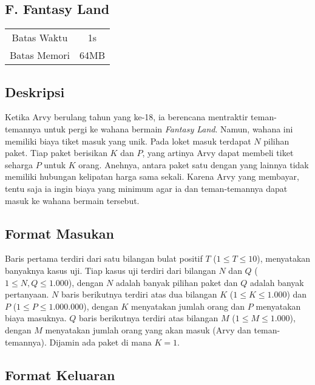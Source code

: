 \documentclass{article}
\begin{document}
\begin{center}
    \section*{F. Fantasy Land} %

    \begin{tabular}{ | c c | }
        \hline
        Batas Waktu  & 1s \\    %
        Batas Memori & 64MB \\  %
        \hline
    \end{tabular}
\end{center}

\subsection*{Deskripsi}

Ketika Arvy berulang tahun yang ke-18, ia berencana mentraktir teman-temannya untuk pergi ke wahana bermain \textit{Fantasy Land}.
Namun, wahana ini memiliki biaya tiket masuk yang unik.
Pada loket masuk terdapat $N$ pilihan paket.
Tiap paket berisikan $K$ dan $P$, yang artinya Arvy dapat membeli tiket seharga $P$ untuk $K$ orang.
Anehnya, antara paket satu dengan yang lainnya tidak memiliki hubungan kelipatan harga sama sekali.
Karena Arvy yang membayar, tentu saja ia ingin biaya yang minimum agar ia dan teman-temannya dapat masuk ke wahana bermain tersebut.


\subsection*{Format Masukan}

Baris pertama terdiri dari satu bilangan bulat positif $T$ ($1 \leq T \leq 10$), menyatakan banyaknya kasus uji.
Tiap kasus uji terdiri dari bilangan $N$ dan $Q$ ($1 \leq N, Q \leq 1.000$), dengan $N$ adalah banyak pilihan paket dan $Q$ adalah banyak pertanyaan.
$N$ baris berikutnya terdiri atas dua bilangan $K$ ($1 \leq K \leq 1.000$) dan $P$ ($1 \leq P \leq 1.000.000$), dengan $K$ menyatakan jumlah orang dan $P$ menyatakan biaya masuknya.
$Q$ baris berikutnya terdiri atas bilangan $M$ ($1 \leq M \leq 1.000$), dengan $M$ menyatakan jumlah orang yang akan masuk (Arvy dan teman-temannya).
Dijamin ada paket di mana $K = 1$.

\subsection*{Format Keluaran}
\end{document}
